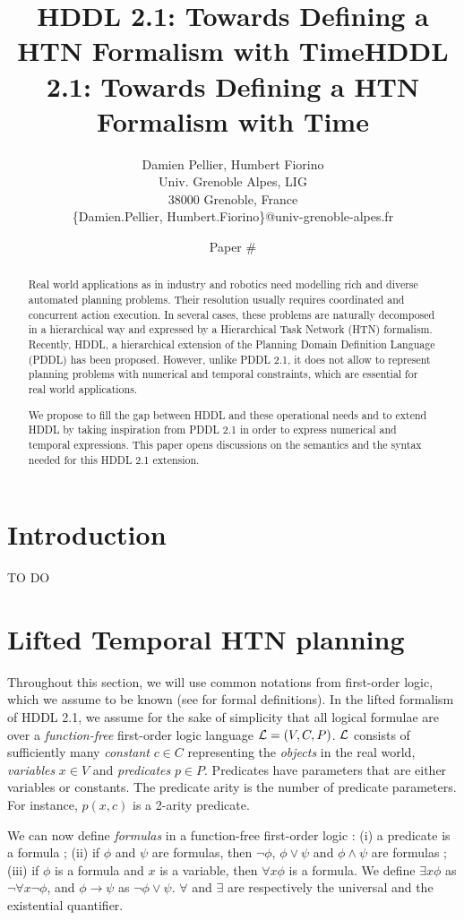 \documentclass[letterpaper]{article} %
\title{HDDL 2.1: Towards Defining a HTN Formalism with Time}
\author{
Damien Pellier, Humbert Fiorino\\
Univ. Grenoble Alpes, LIG\\
38000 Grenoble, France\\
\{Damien.Pellier, Humbert.Fiorino\}@univ-grenoble-alpes.fr}
\title{HDDL 2.1: Towards Defining a HTN Formalism with Time}
\author{Paper \#}
\begin{document}
\maketitle

\begin{abstract}
Real world applications as in industry and robotics need modelling rich and diverse automated planning problems. Their resolution usually requires coordinated and concurrent action execution. In several cases, these problems are naturally decomposed in a hierarchical way and expressed by a Hierarchical Task Network (HTN) formalism. Recently, HDDL, a hierarchical extension of the Planning Domain Definition Language (PDDL) has been proposed. However, unlike PDDL 2.1, it does not allow to represent planning problems with numerical and temporal constraints, which are essential for real world applications.

We propose to fill the gap between HDDL and these operational needs and to extend HDDL by taking inspiration from  PDDL 2.1 in order to express numerical and temporal expressions. This paper opens discussions on the semantics and the syntax needed for this HDDL 2.1 extension.
\end{abstract}

\section{Introduction}

TO DO

\section{Lifted Temporal HTN planning}

Throughout this section, we will use common notations from first-order logic, which we assume to be known (see \cite{xx} for formal definitions). In the lifted formalism of HDDL 2.1, we assume for the sake of simplicity that all logical formulae are over a {\it function-free} first-order logic language ${\cal{L}} = (V, C, P)$. ${\cal{L}}$ consists of sufficiently many {\it constant} $c \in C$ representing the {\it objects} in the real world, {\it variables} $x \in V$ and {\it predicates} $p \in P$. Predicates have parameters that are either variables or constants. The predicate arity is the number of predicate parameters. For instance, $p(x, c)$ is a 2-arity predicate.

We can now define {\it formulas} in a function-free first-order logic \cite{ghallab}: (i) a predicate is a formula ; (ii) if ${\phi}$ and ${\psi}$ are formulas, then $\neg \phi$, $\phi \vee \psi$ and $\phi \wedge \psi$ are formulas ; (iii) if $\phi$ is a formula and $x$ is a variable, then $\forall x \phi$ is a formula. We define $\exists x \phi$ as $\neg \forall x \neg \phi$, and $\phi \rightarrow \psi$ as $\neg \phi \vee \psi$. $\forall$ and $\exists$ are respectively the universal and the existential quantifier. 
\end{document}
